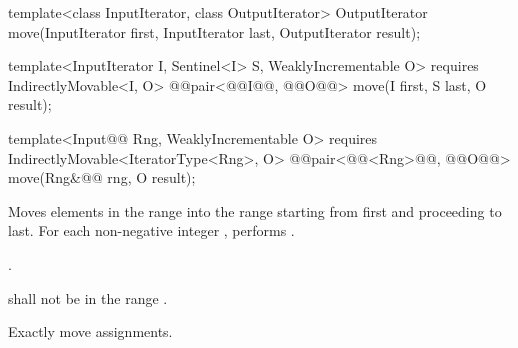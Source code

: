 %
\begin{removedblock}
\begin{itemdecl}
template<class InputIterator, class OutputIterator>
  OutputIterator move(InputIterator first, InputIterator last,
                      OutputIterator result);
\end{itemdecl}
\end{removedblock}
\begin{addedblock}
\begin{itemdecl}
template<InputIterator I, Sentinel<I> S, WeaklyIncrementable O>
  requires IndirectlyMovable<I, O>
  @@pair<@@I@\newtxt{)}@, @@O@\newtxt{)}@>
    move(I first, S last, O result);

template<Input@@ Rng, WeaklyIncrementable O>
  requires IndirectlyMovable<IteratorType<Rng>, O>
  @@pair<@@<Rng>@\newtxt{)}@, @@O@\newtxt{)}@>
    move(Rng&@\newtxt{\&}@ rng, O result);
\end{itemdecl}
\end{addedblock}

\begin{itemdescr}
\pnum
\effects
Moves elements in the range 
into the range 
starting from first and proceeding to last.
For each non-negative integer
,
performs
 .

\pnum
\returns
{}.

\pnum
\requires
{}
shall not be in the range
.

\pnum
\complexity
Exactly
move assignments.
\end{itemdescr}

